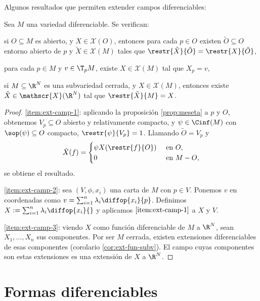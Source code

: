 Algunos resultados que permiten extender campos diferenciables:
\begin{nprop}
  Sea $M$ una variedad diferenciable. Se verifican:
  \begin{nlist}
  \item \label{item:ext-camp-1}
    si $O\subseteq M$ es abierto, y $X\in \mathscr{X}(O)$, entonces para cada
    $p\in O$ existen $\tilde{O}\subseteq O$ entorno abierto de $p$ y
    $\tilde{X}\in \mathscr{X}(M)$ tales que $\restr{\tilde{X}}{\tilde{O}} =
    \restr{X}{\tilde{O}}$,
  \item \label{item:ext-camp-2}
    para cada $p\in M$ y $v\in \T_{p}M$, existe $X\in \mathscr{X}(M)$ tal que
    $X_{p}=v$,
  \item \label{item:ext-camp-3}
    si $M\subseteq \R^{N}$ es una subvariedad cerrada, y $X\in \mathscr{X}(M)$,
    entonces existe $\tilde{X}\in \mathscr{X}(\R^{N})$ tal que
    $\restr{\tilde{X}}{M} = X$.
  \end{nlist}
\end{nprop}
\begin{proof}
  \ref{item:ext-camp-1}: aplicando la proposición \ref{prop:meseta} a $p$ y $O$,
  obtenemos $V_{p}\subseteq O$ abierto y relativamente compacto, y
  $\psi\in\Cinf(M)$ con $\sop(\psi)\subseteq O$ compacto, $\restr{\psi}{V_{p}} =
  1$. Llamando $\tilde{O} = V_{p}$ y
  \[
    \tilde{X}(f) =
    \begin{cases}
      \psi X(\restr{f}{O}) & \text{ en $O$}, \\
      0 & \text{ en $M-O$},
    \end{cases}
    \] se obtiene el resultado.

    \ref{item:ext-camp-2}: sea $(V,\phi,x_{i})$ una carta de $M$ con $p\in
    V$. Ponemos $v$ en coordenadas como $v =
    \sum_{i=1}^{n}\lambda_{i}\diffop{x_{i}}{p}$. Definimos $X:=
    \sum_{i=1}^{n}\lambda_{i}\diffop{x_{i}}{}$ y aplicamos $\ref{item:ext-camp-1}$
    a $X$ y $V$.

    \ref{item:ext-camp-3}: viendo $X$ como función diferenciable de $M$ a
    $\R^{N}$, sean $X_{1}, \dots, X_{n}$ sus componentes. Por ser $M$ cerrada,
    existen extensiones diferenciables de esas componentes (corolario
    \ref{cor:ext-fun-subv}). El campo cuyas componentes son estas extensiones es
    una extensión de $X$ a $\R^{N}$.
\end{proof}

\section{Formas diferenciables}

